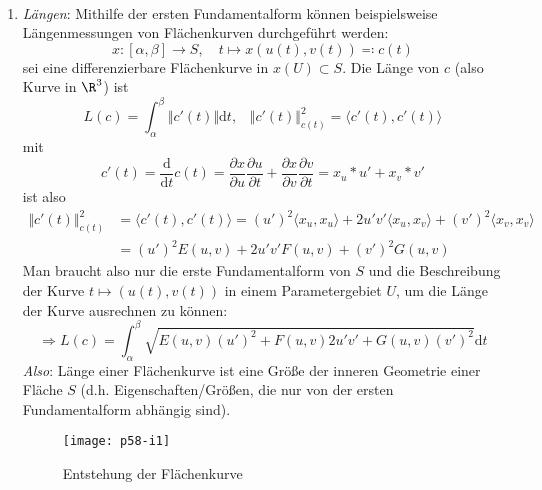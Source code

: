 \begin{remark}
 \
 \begin{enumerate}

   \item \emph{Längen}: Mithilfe der ersten Fundamentalform können beispielsweise Längenmessungen von Flächenkurven durchgeführt werden:
  \begin{equation*}
    x: [\alpha, \beta] \to S, \quad t \mapsto x(u(t), v(t)) \eqqcolon c(t)
  \end{equation*}
  sei eine differenzierbare Flächenkurve in $ x(U) \subset S $. Die Länge von $ c $ (also Kurve in $ \R^3 $) ist
  \begin{equation*}
    L(c) = \int_\alpha^\beta \Vert c'(t) \Vert \text{d}t\text{,} \quad \Vert c'(t) \Vert_{c(t)}^2 = \langle c'(t), c'(t) \rangle
  \end{equation*}
  mit
  \begin{equation*}
    c'(t) = \frac{\text{d}}{\text{d}t}c(t) = \frac{\partial x}{\partial u} \frac{\partial u}{\partial t} + \frac{\partial x}{\partial v} \frac{\partial v}{\partial t} = x_u * u' + x_v * v'
  \end{equation*}
  ist also
  \begin{align*}
    \Vert c'(t) \Vert_{c(t)}^2 &= \langle c'(t), c'(t) \rangle = (u')^2\langle x_u, x_u \rangle + 2u'v'\langle x_u, x_v \rangle + (v')^2\langle x_v, x_v \rangle \\
    &= (u')^2E(u,v) + 2u'v'F(u,v) + (v')^2G(u,v)
  \end{align*}
  Man braucht also nur die erste Fundamentalform von $ S $ und die Beschreibung der Kurve $ t \mapsto (u(t),v(t)) $ in einem Parametergebiet $ U $, um die Länge der Kurve ausrechnen zu können:
  \begin{equation*}
    \Rightarrow L(c) = \int_\alpha^\beta \sqrt{E(u,v)(u')^2 + F(u,v)2u'v' + G(u,v)(v')^2}\text{d}t
  \end{equation*}
  \emph{Also}: Länge einer Flächenkurve ist eine Größe der inneren Geometrie einer Fläche $ S $ (d.h. Eigenschaften/Größen, die nur von der ersten Fundamentalform abhängig sind).

  \begin{figure}[H]
    \texttt{[image: p58-i1]}
    \caption{Entstehung der Flächenkurve}
  \end{figure}


\end{enumerate}
\end{remark}
